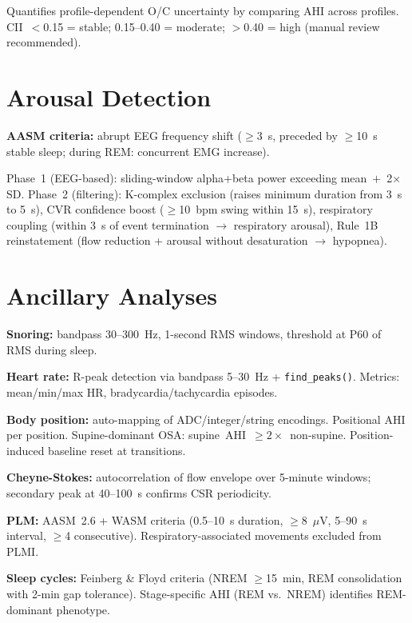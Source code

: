 \documentclass[11pt,a4paper]{article}
\begin{document}
Quantifies profile-dependent O/C uncertainty by comparing AHI across
profiles. CII~$<$0.15 = stable; 0.15--0.40 = moderate;
$>$0.40 = high (manual review recommended).

\section{Arousal Detection}

\textbf{AASM criteria:} abrupt EEG frequency shift ($\geq$3~s, preceded
by $\geq$10~s stable sleep; during REM: concurrent EMG increase).

Phase~1 (EEG-based): sliding-window alpha+beta power exceeding
mean~$+$~2$\times$SD. Phase~2 (filtering): K-complex exclusion (raises
minimum duration from 3~s to 5~s), CVR confidence boost
($\geq$10~bpm swing within 15~s), respiratory coupling (within 3~s of
event termination $\to$ respiratory arousal), Rule~1B reinstatement
(flow reduction + arousal without desaturation $\to$ hypopnea).

\section{Ancillary Analyses}

\textbf{Snoring:} bandpass 30--300~Hz, 1-second RMS windows, threshold
at P60 of RMS during sleep.

\textbf{Heart rate:} R-peak detection via bandpass 5--30~Hz +
\texttt{find\_peaks()}. Metrics: mean/min/max HR, bradycardia/tachycardia
episodes.

\textbf{Body position:} auto-mapping of ADC/integer/string encodings.
Positional AHI per position. Supine-dominant OSA: supine~AHI~$\geq
2\times$~non-supine. Position-induced baseline reset at transitions.

\textbf{Cheyne-Stokes:} autocorrelation of flow envelope over
5-minute windows; secondary peak at 40--100~s confirms CSR periodicity.

\textbf{PLM:} AASM~2.6 + WASM criteria (0.5--10~s duration, $\geq$8~$\mu$V,
5--90~s interval, $\geq$4 consecutive). Respiratory-associated movements
excluded from PLMI.

\textbf{Sleep cycles:} Feinberg \& Floyd criteria (NREM $\geq$15~min,
REM consolidation with 2-min gap tolerance). Stage-specific AHI (REM
vs.\ NREM) identifies REM-dominant phenotype.
\end{document}
